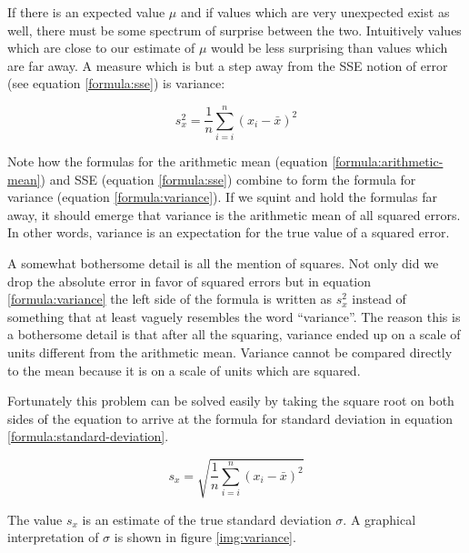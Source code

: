 \documentclass{tufte-book} %
\begin{document}
If there is an expected value $\mu$ and if values which are very unexpected exist as well, there must be some spectrum of surprise between the two. Intuitively values which are close to our estimate of $\mu$ would be less surprising than values which are far away. A measure which is but a step away from the SSE notion of error (see equation \ref{formula:sse}) is variance: 

\begin{equation} \label{formula:variance}
	s_x^2 = \frac{1}{n} \sum_{i=i}^{n} (x_i - \bar{x})^2
\end{equation}

Note how the formulas for the arithmetic mean (equation \ref{formula:arithmetic-mean}) and SSE (equation \ref{formula:sse}) combine to form the formula for variance (equation \ref{formula:variance}). If we squint and hold the formulas far away, it should emerge that variance is the arithmetic mean of all squared errors. In other words, variance is an expectation for the true value of a squared error. 

A somewhat bothersome detail is all the mention of squares. Not only did we drop the absolute error in favor of squared errors but in equation \ref{formula:variance} the left side of the formula is written as $s_x^2$ instead of something that at least vaguely resembles the word ``variance''. The reason this is a bothersome detail is that after all the squaring, variance ended up on a scale of units different from the arithmetic mean. Variance cannot be compared directly to the mean because it is on a scale of units which are squared.

Fortunately this problem can be solved easily by taking the square root on both sides of the equation to arrive at the formula for standard deviation in equation \ref{formula:standard-deviation}.

\begin{equation} \label{formula:standard-deviation}
	s_x = \sqrt{\frac{1}{n} \sum_{i=i}^{n} (x_i - \bar{x})^2} 
\end{equation}

The value $s_x$ is an estimate of the true standard deviation $\sigma$. A graphical interpretation of $\sigma$ is shown in figure \ref{img:variance}.
\end{document}
